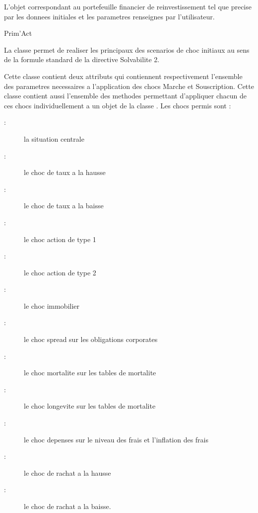 \documentclass[a4paper]{book}
\begin{document}
%
\begin{Value}
L'objet  correspondant au portefeuille financier de reinvestissement
tel que precise par les donnees initiales et les parametres renseignes par l'utilisateur.
\end{Value}
%
\begin{Author}\relax
Prim'Act
\end{Author}
%
\begin{Description}\relax
La classe  permet de realiser les principaux des scenarios de choc initiaux
au sens de la formule standard de la directive Solvabilite 2.
\end{Description}
%
\begin{Details}\relax
Cette classe contient deux attributs
qui contiennent respectivement l'ensemble des parametres necessaires a l'application des chocs Marche et Souscription.
Cette classe contient aussi l'ensemble des methodes permettant d'appliquer chacun de ces chocs individuellement
a un objet de la classe . Les chocs permis sont :
\begin{description}

\item[ : ] la situation centrale
\item[ : ] le choc de taux a la hausse
\item[ : ] le choc de taux a la baisse
\item[ : ] le choc action de type 1
\item[ : ] le choc action de type 2
\item[ : ] le choc immobilier
\item[ : ] le choc spread sur les obligations corporates
\item[ : ] le choc mortalite sur les tables de mortalite
\item[ : ] le choc longevite sur les tables de mortalite
\item[ : ] le choc depenses sur le niveau des frais et l'inflation des frais
\item[ : ] le choc de rachat a la hausse
\item[ : ] le choc de rachat a la baisse.

\end{description}

\end{Details}
\end{document}
